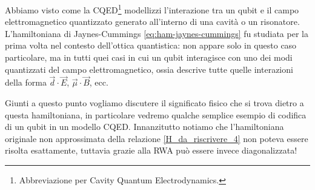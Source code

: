 
\vspace{1cm}
\noindent{}
\vspace{0.5cm}

\noindent Abbiamo visto come la CQED\footnote{Abbreviazione per Cavity Quantum Electrodynamics.} modellizzi l'interazione tra un qubit e il campo elettromagnetico quantizzato generato all'interno di una cavità o un risonatore. L'hamiltoniana di Jaynes-Cummings \eqref{eq:ham-jaynes-cummings} fu studiata per la prima volta nel contesto dell'ottica quantistica: non appare solo in questo caso particolare, ma in tutti quei casi in cui un qubit interagisce con uno dei modi quantizzati del campo elettromagnetico, ossia descrive tutte quelle interazioni della forma $\vec d \cdot \vec E$, $\vec \mu \cdot \vec B$, ecc.

\noindent Giunti a questo punto vogliamo discutere il significato fisico che si trova dietro a questa hamiltoniana, in particolare vedremo qualche semplice esempio di codifica di un qubit in un modello CQED. Innanzitutto notiamo che l'hamiltoniana originale non approssimata della relazione \eqref{H_da_riscrivere_4} non poteva essere risolta esattamente, tuttavia grazie alla RWA può essere invece diagonalizzata! 

